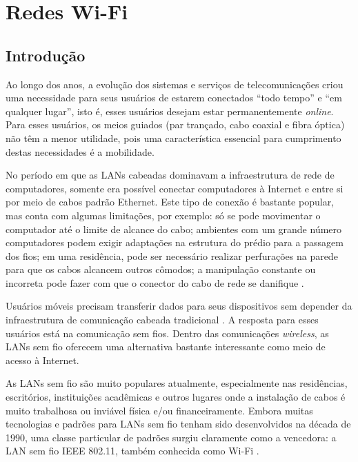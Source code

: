 \chapter{Redes Wi-Fi}
\label{cap:redes-wifi}

\section{Introdução}
\label{sec:introducao}

Ao longo dos anos, a evolução  dos sistemas e serviços de telecomunicações criou uma necessidade para seus usuários de estarem conectados ``todo tempo'' e ``em qualquer lugar'', isto é, esses usuários desejam estar permanentemente \textit{online}. Para esses usuários, os meios guiados (par trançado, cabo coaxial e fibra óptica) não têm a menor utilidade, pois uma característica essencial para cumprimento destas necessidades é a mobilidade.

No período em que as LANs cabeadas dominavam a infraestrutura de rede de computadores, somente era possível conectar computadores à Internet e entre si por meio de cabos padrão Ethernet. Este tipo de conexão é bastante popular, mas conta com algumas limitações, por exemplo: só se pode movimentar o computador até o limite de alcance do cabo; ambientes com um grande número computadores podem exigir adaptações na estrutura do prédio para a passagem dos fios; em uma residência, pode ser necessário realizar perfurações na parede para que os cabos alcancem outros cômodos; a manipulação constante ou incorreta pode fazer com que o conector do cabo de rede se danifique \cite{alecrim2008site}.

Usuários móveis precisam transferir dados para seus dispositivos sem depender da infraestrutura de comunicação cabeada tradicional \cite{tanenbaum2011}. A resposta para esses usuários está na comunicação sem fios. Dentro das comunicações \textit{wireless}, as LANs sem fio oferecem uma alternativa bastante interessante como meio de acesso à Internet.

As LANs sem fio são muito populares atualmente, especialmente nas residências, escritórios, instituições acadêmicas e outros lugares onde a instalação de cabos é muito trabalhosa ou inviável física e/ou financeiramente. Embora muitas tecnologias e padrões para LANs sem fio tenham sido desenvolvidos na década de 1990, uma classe particular de padrões surgiu claramente como a vencedora: a LAN sem fio IEEE 802.11, também conhecida como Wi-Fi \cite{kurose2013}.

